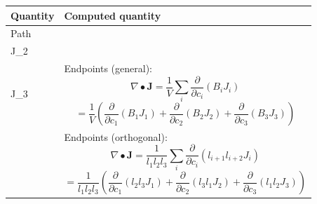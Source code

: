 \begin{center}
\begin{tabular}{|m{}||m{}|}
\hline
Quantity 
& 
Computed quantity 
\\
\hline
\hline  
Path \[\mathbf{J} = \begin{bmatrix} J_1 \\ J_2 \\ J_3 \end{bmatrix}\] 
& 
Endpoints (general): 
\[\nabla \bullet \mathbf{J} = \frac{1}{V}\sum_i \frac{\partial}{\partial c_i}(B_i J_i)\] 
\[= \frac{1}{V}\left(\frac{\partial}{\partial c_1}(B_1 J_1) + \frac{\partial}{\partial c_2}(B_2 J_2) + \frac{\partial}{\partial c_3}(B_3 J_3)\right)\] 
\\ 
&
Endpoints (orthogonal): 
\[\nabla \bullet \mathbf{J} = \frac{1}{l_1 l_2 l_3}\sum_i \frac{\partial}{\partial c_i}(l_{i+1} l_{i+2} J_i)\] 
\[= \frac{1}{l_1 l_2 l_3}\left(\frac{\partial}{\partial c_1}(l_2 l_3 J_1) + \frac{\partial}{\partial c_2}(l_3 l_1 J_2) + \frac{\partial}{\partial c_3}(l_1 l_2 J_3)\right)\] 
\\
\hline
\end{tabular}
\end{center}

